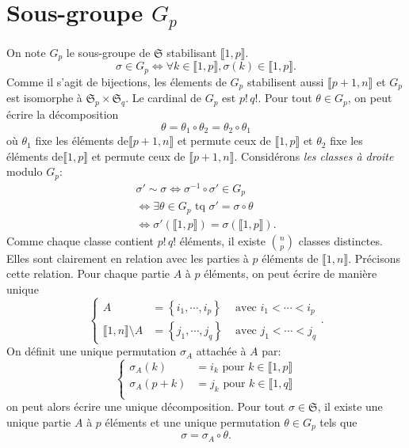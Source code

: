 \section*{Sous-groupe $G_p$}
On note $G_p$ le sous-groupe de $\mathfrak{S}$ stabilisant $\llbracket 1,p \rrbracket$.
\[
 \sigma \in G_p \Leftrightarrow \forall k \in \llbracket 1,p \rrbracket, \sigma(k) \in \llbracket 1,p \rrbracket.
\]
Comme il s'agit de bijections, les élements de $G_p$ stabilisent aussi $\llbracket p+1,n\rrbracket$ et $G_p$ est isomorphe à $\mathfrak{S}_p\times \mathfrak{S}_q$.  Le cardinal de $G_p$ est $p!\, q!$.\newline
Pour tout $\theta \in G_p$, on peut écrire la décomposition
\begin{equation}\label{theta1-2}
 \theta = \theta_1 \circ \theta_2 = \theta_2 \circ \theta_1 
\end{equation}
où $\theta_1$ fixe les éléments de$\llbracket p+1, n\rrbracket$ et permute ceux de $\llbracket 1,p\rrbracket$ et $\theta_2$ fixe les éléments de$\llbracket 1, p\rrbracket$ et permute ceux de $\llbracket p+1,n\rrbracket$.  
Considérons \emph{les classes à droite} modulo $G_p$:
\begin{multline*}
 \sigma' \sim \sigma \Leftrightarrow \sigma^{-1} \circ \sigma' \in G_p \\
 \Leftrightarrow \exists \theta \in G_p \text{ tq } \sigma' = \sigma \circ \theta \\
 \Leftrightarrow \sigma'(\llbracket 1,p \rrbracket) = \sigma(\llbracket 1,p \rrbracket).
\end{multline*}
Comme chaque classe contient $p!\,q!$ éléments, il existe $\binom{n}{p}$ classes distinctes. Elles sont clairement en relation avec les parties à $p$ éléments de $\llbracket 1,n \rrbracket$.\newline
Précisons cette relation. Pour chaque partie $A$ à $p$ éléments, on peut écrire de manière unique
\[
 \left\lbrace 
 \begin{aligned}
  A &= \left\lbrace i_1, \cdots, i_p\right\rbrace &\text{ avec } i_1 < \cdots < i_p \\
  \llbracket 1,n \rrbracket \setminus A &= \left\lbrace j_1, \cdots, j_q\right\rbrace &\text{ avec } j_1 < \cdots < j_q 
 \end{aligned}
 \right. .
\]
On définit une unique permutation $\sigma_A$ attachée à $A$ par:
\[
 \left\lbrace 
 \begin{aligned}
  \sigma_A(k) &= i_k \text{ pour } k\in \llbracket 1,p \rrbracket \\
  \sigma_A(p+k) &= j_k \text{ pour } k\in \llbracket 1,q \rrbracket \\
 \end{aligned}
\right. 
\]
on peut alors écrire une unique décomposition.\newline
Pour tout $\sigma \in \mathfrak{S}$, il existe une unique partie $A$ à $p$ éléments et une unique permutation $\theta \in G_p$ tels que
\[
 \sigma = \sigma_A \circ \theta.
\]

